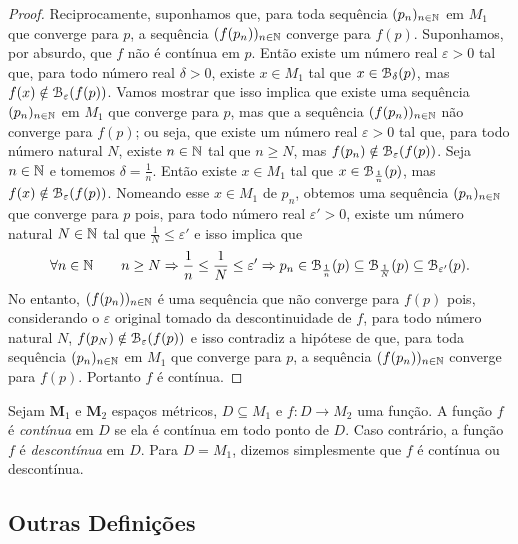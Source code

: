 \begin{proof}
	Reciprocamente, suponhamos que, para toda sequência $(p_n)_{n \in \mathbb{N}}$ em $M_1$ que converge para $p$, a sequência $(f(p_n))_{n \in \mathbb{N}}$ converge para $f(p)$. Suponhamos, por absurdo, que $f$ não é contínua em $p$. Então existe um número real $\varepsilon > 0$ tal que, para todo número real $\delta > 0$, existe $x \in M_1$ tal que $x \in \mathcal{B}_\delta(p)$, mas $f(x) \notin \mathcal{B}_\varepsilon(f(p))$. Vamos mostrar que isso implica que existe uma sequência $(p_n)_{n \in \mathbb{N}}$ em $M_1$ que converge para $p$, mas que a sequência $(f(p_n))_{n \in \mathbb{N}}$ não converge para $f(p)$; ou seja, que existe um número real $\varepsilon > 0$ tal que, para todo número natural $N$, existe $n \in \mathbb{N}$ tal que $n \geq N$, mas $f(p_n) \notin \mathcal{B}_\varepsilon(f(p))$. Seja $n \in \mathbb{N}$ e tomemos $\delta = \frac{1}{n}$. Então existe $x \in M_1$ tal que $x \in \mathcal{B}_\frac{1}{n}(p)$, mas $f(x) \notin \mathcal{B}_\varepsilon(f(p))$. Nomeando esse $x \in M_1$ de $p_n$, obtemos uma sequência $(p_n)_{n \in \mathbb{N}}$ que converge para $p$ pois, para todo número real $\varepsilon' > 0$, existe um número natural $N \in \mathbb{N}$ tal que $\frac{1}{N} \leq \varepsilon'$ e isso implica que
\begin{equation*}
	\forall n \in \mathbb{N} \qquad n \geq N \Rightarrow \frac{1}{n} \leq \frac{1}{N} \leq \varepsilon' \Rightarrow p_n \in \mathcal{B}_\frac{1}{n}(p) \subseteq \mathcal{B}_\frac{1}{N}(p) \subseteq \mathcal{B}_{\varepsilon'}(p).
	\end{equation*}
	No entanto, $(f(p_n))_{n \in \mathbb{N}}$ é uma sequência que não converge para $f(p)$ pois, considerando o $\varepsilon$ original tomado da descontinuidade de $f$, para todo número natural $N$, $f(p_N) \notin \mathcal{B}_\varepsilon(f(p))$ e isso contradiz a hipótese de que, para toda sequência $(p_n)_{n \in \mathbb{N}}$ em $M_1$ que converge para $p$, a sequência $(f(p_n))_{n \in \mathbb{N}}$ converge para $f(p)$. Portanto $f$ é contínua.	
\end{proof}

\begin{defi}
Sejam $\bm M_1$ e $\bm M_2$ espaços métricos, $D \subseteq M_1$ e $f: D \to M_2$ uma função. A função $f$ é \emph{contínua} em $D$ se ela é contínua em todo ponto de $D$. Caso contrário, a função $f$ é \emph{descontínua} em $D$. Para $D=M_1$, dizemos simplesmente que $f$ é contínua ou descontínua.
\end{defi}

\subsection{Outras Definições}

